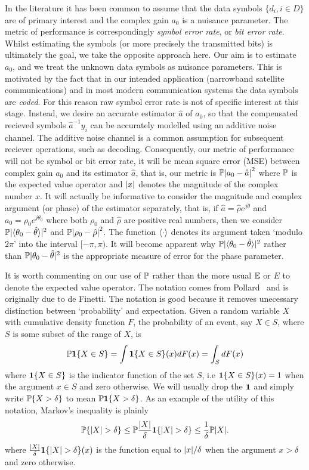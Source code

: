 \documentclass[journal]{IEEEtran}
\begin{document}
In the literature it has been common to assume that the data symbols $\{d_i, i \in D\}$ are of primary interest and the complex gain $a_0$ is a nuisance parameter.  The metric of performance is correspondingly \emph{symbol error rate}, or \emph{bit error rate}.  Whilst estimating the symbols (or more precisely the transmitted bits) is ultimately the goal, we take the opposite approach here.  Our aim is to estimate $a_0$, and we treat the unknown data symbols as nuisance parameters.  This is motivated by the fact that in our intended application (narrowband satellite communications) and in most modern communication systems the data symbols are \emph{coded}.  For this reason raw symbol error rate is not of specific interest at this stage.  Instead, we desire an accurate estimator $\hat{a}$ of $a_0$, so that the compensated recieved symbols $\hat{a}^{-1}y_i$ can be accurately modelled using an additive noise channel.  The additive noise channel is a common assumption for subsequent reciever operations, such as decoding.  Consequently, our metric of performance will not be symbol or bit error rate, it will be mean square error (MSE) between complex gain $a_0$ and its estimator $\hat{a}$, that is, our metric is ${\mathbb P}{\left| a_0 - \hat{a} \right|}^2$ where ${\mathbb P}$ is the expected value operator and ${\left| x \right|}$ denotes the magnitude of the complex number $x$. It will actually be informative to consider the magnitude and complex argument (or phase) of the estimator separately, that is, if $\hat{a} = \hat{\rho}e^{j\hat{\theta}}$ and $a_0 = \rho_0e^{j\theta_0}$ where both $\rho_0$ and $\hat{\rho}$ are positive real numbers, then we consider ${\mathbb P}\vert\langle\theta_0 - \hat{\theta}\rangle\vert^2$ and ${\mathbb P}{\left| \rho_0 - \hat{\rho} \right|}^2$.  The function $\left\langle \cdot \right\rangle$ denotes its argument taken `modulo $2\pi$' into the interval $[-\pi, \pi)$.  It will become apparent why ${\mathbb P}\vert\langle\theta_0 - \hat{\theta}\rangle\vert^2$ rather than ${\mathbb P}\vert\theta_0 - \hat{\theta}\vert^2$ is the appropriate measure of error for the phase parameter.

It is worth commenting on our use of ${\mathbb P}$ rather than the more usual ${\mathbb E}$ or $E$ to denote the expected value operator.  The notation comes from Pollard~\cite[Ch 1]{Pollard_users_guide_prob_2002} and is originally due to de Finetti.  The notation is good because it removes unecessary distinction between `probability' and expectation.  Given a random variable $X$ with cumulative density function $F$, the probability of an event, say $X \in S$, where $S$ is some subset of the range of $X$, is 
\[
{\mathbb P} {\mathbf 1} \{X \in S\} = \int {\mathbf 1} \{X \in S\}(x) dF(x) = \int_{S} dF(x)
\]
where ${\mathbf 1} \{X \in S\}$ is the indicator function of the set $S$, i.e ${\mathbf 1} \{X \in S\}(x) = 1$ when the argument $x \in S$ and zero otherwise.  We will usually drop the $\boldsymbol{1}$ and simply write ${\mathbb P} \{ X > \delta \}$ to mean ${\mathbb P} \boldsymbol{1}\{ X > \delta \}$.  As an example of the utility of this notation, Markov's inequality is plainly 
\[
{\mathbb P} \{ {\left| X \right|} > \delta \}  \leq {\mathbb P} \frac{{\left| X \right|}}{\delta}\boldsymbol{1}\{ {\left| X \right|} > \delta \} \leq \frac{1}{\delta}{\mathbb P}{\left| X \right|}.
\]
where $\frac{{\left| X \right|}}{\delta}\boldsymbol{1}\{ {\left| X \right|} > \delta \}(x)$ is the function equal to ${\left| x \right|}/\delta$ when the argument $x > \delta$ and zero otherwise.
\end{document}
